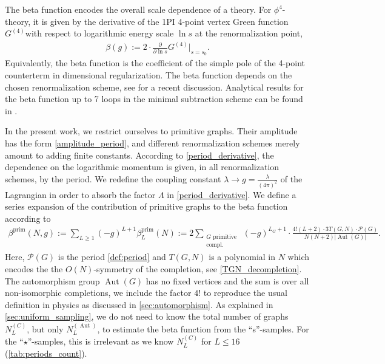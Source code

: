 \documentclass[11pt,a4paper]{article}
\newcommand{\abs}[1]{\lvert #1 \rvert}
\newcommand{\period}{\mathcal P}
\newcommand{\Aut}{\operatorname{Aut}}
\renewcommand{\|}{\rule[-0.4ex]{0.2ex}{1.2em}}
\begin{document}
The beta function encodes the overall scale dependence of a theory. For $\phi^4$-theory, it is given by the derivative of the 1PI 4-point vertex Green function $G^{(4)}$with respect to logarithmic energy scale $\ln s$ at the renormalization point, 
\begin{align*}
\beta(g) := 2\cdot \frac{\partial}{\partial \ln s}G^{(4)} \Big|_{s=s_0}.
\end{align*}
Equivalently, the beta function is the coefficient of the simple pole of the 4-point counterterm in dimensional regularization. The beta function depends on the chosen renormalization scheme, see \cite{balduf_dyson_2023} for a recent discussion. Analytical results for the beta function up to 7 loops in the  minimal subtraction scheme can be found in \cite{schnetz_numbers_2018,schnetz_phi_2023}.

In the present work, we restrict ourselves to  primitive graphs. 
Their amplitude has the form \cref{amplitude_period}, and different renormalization schemes merely amount to adding finite constants. According to \cref{period_derivative}, the dependence on the logarithmic momentum is given, in all renormalization schemes, by the period. We redefine the coupling constant $\lambda\rightarrow g=\frac{\lambda}{(4\pi)^2}$ of the Lagrangian  in order to absorb the factor $\Lambda$ in \cref{period_derivative}. 
We define a series expansion of the contribution of primitive graphs to the beta function according to
\begin{align}\label{beta_expansion}
	\beta^{\text{prim}}(N,g) :=   \sum_{L \geq 1} (-g)^{L+1} \beta^{\text{prim}}_{L}(N) := 2\sum_{ \substack{G \text{ primitive }\\ \text{compl.}}  } (-g)^{L_G+1}\cdot \frac{ 4!(L+2) \cdot 3T(G,N)\cdot \period (G)}{N(N+2)\abs{\Aut(G)}}.
\end{align}
Here, $\period(G)$ is the period \cref{def:period} and $T(G,N)$ is a polynomial in $N$ which encodes the the $O(N)$-symmetry of the completion, see \cref{TGN_decompletion}. The automorphism group $\Aut(G)$ has no fixed vertices and the sum is over all non-isomorphic completions, we include the factor $4!$ to reproduce the usual definition in physics as discussed in \cref{sec:automorphism}. As explained in \cref{sec:uniform_sampling}, we do not need to know the total number of graphs $N^{(C)}_L$, but only $N^{(\Aut)}_L$, to estimate the beta function from the \enquote{s}-samples. For the \enquote{$\star$}-samples, this is irrelevant as we know $N^{(C)}_L$ for $L\leq 16$ (\cref{tab:periods_count}).
\end{document}
